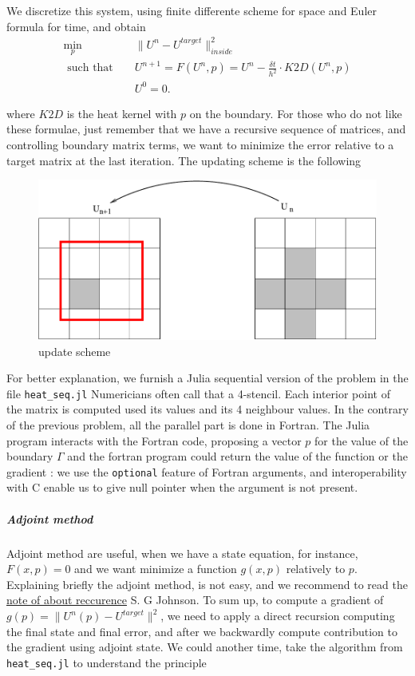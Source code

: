 \documentclass[11pt]{article}
\begin{document}
{We discretize this system, using finite differente scheme for space and
Euler formula for time, and obtain \begin{eqnarray}
   \min_p &&  \|U^n- U^{target}\|^2_{inside}  \\
   \mbox { such that }     && U^{n+1} = F(U^n,p) = U^n - \frac{\delta t}{h^2} \cdot K2D(U^n,p) \\
                           && U^0 = 0. 
\end{eqnarray}

where \(K2D\) is the heat kernel with \(p\) on the boundary. For those
who do not like these formulae, just remember that we have a recursive
sequence of matrices, and controlling boundary matrix terms, we want to
minimize the error relative to a target matrix at the last iteration.
The updating scheme is the following

\begin{figure}
\centering
\includegraphics{figures/buffer.pdf}
\caption{update scheme}
\end{figure}

For better explanation, we furnish a Julia sequential version of the
problem in the file \texttt{heat\_seq.jl} Numericians often call that a
4-stencil. Each interior point of the matrix is computed used its values
and its 4 neighbour values. In the contrary of the previous problem, all
the parallel part is done in Fortran. The Julia program interacts with
the Fortran code, proposing a vector \(p\) for the value of the boundary
\(\Gamma\) and the fortran program could return the value of the
function or the gradient : we use the \texttt{optional} feature of
Fortran arguments, and interoperability with C enable us to give null
pointer when the argument is not present.

\hypertarget{adjoint-method}{%
\subparagraph{Adjoint method}\label{adjoint-method}}

Adjoint method are useful, when we have a state equation, for instance,
\(F(x,p) = 0\) and we want minimize a function \(g(x,p)\) relatively to
\(p\). Explaining briefly the adjoint method, is not easy, and we
recommend to read the
\href{https://github.com/mitmath/18335/blob/master/notes/adjoint/recurrence2.pdf}{note
of about reccurence} S. G Johnson. To sum up, to compute a gradient of
\(g(p)= \| U^n(p) - U^{target} \|^2\), we need to apply a direct
recursion computing the final state and final error, and after we
backwardly compute contribution to the gradient using adjoint state. We
could another time, take the algorithm from \texttt{heat\_seq.jl} to
understand the principle

}
\end{document}
